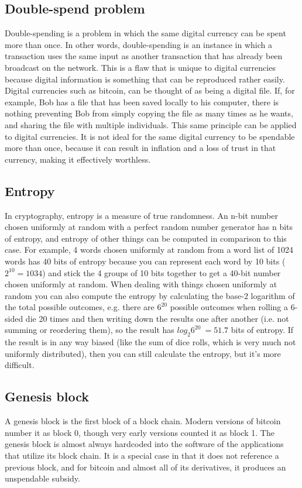 \documentclass{article}
\begin{document}
\subsection{Double-spend problem}
Double-spending is a problem in which the same digital currency can be spent
more than once. In other words, double-spending is an instance in which a
transaction uses the same input as another transaction that has already been
broadcast on the network. This is a flaw that is unique to digital currencies
because digital information is something that can be reproduced rather easily.
Digital currencies such as bitcoin, can be thought of as being a digital file.
If, for example, Bob has a file that has been saved locally to his computer,
there is nothing preventing Bob from simply copying the file as many times
as he wants, and sharing the file with multiple individuals. This same
principle can be applied to digital currencies. It is not ideal for the same
digital currency to be spendable more than once, because it can result in
inflation and a loss of trust in that currency, making it effectively
worthless.

\subsection{Entropy}
In cryptography, entropy is a measure of true randomness. An n-bit number
chosen uniformly at random with a perfect random number generator has n bits
of entropy, and entropy of other things can be computed in comparison to this
case. For example, 4 words chosen uniformly at random from a word list of 1024
words has 40 bits of entropy because you can represent each word by 10 bits
($2^10 = 1034$) and stick the 4 groups of 10 bits together to get a 40-bit
number chosen uniformly at random. When dealing with things chosen uniformly
at random you can also compute the entropy by calculating the base-2 logarithm
of the total possible outcomes, e.g. there are $6^{20}$ possible outcomes when
rolling a 6-sided die 20 times and then writing down the results one after
another (i.e. not summing or reordering them), so the result has $log_2 6^{20}
~= 51.7$ bits of entropy. If the result is in any way biased (like the sum of
dice rolls, which is very much not uniformly distributed), then you can still
calculate the entropy, but it's more difficult.

\subsection{Genesis block}
A genesis block is the first block of a block chain. Modern versions of bitcoin
number it as block 0, though very early versions counted it as block 1. The
genesis block is almost always hardcoded into the software of the applications
that utilize its block chain. It is a special case in that it does not
reference a previous block, and for bitcoin and almost all of its derivatives,
it produces an unspendable subsidy.
\end{document}

